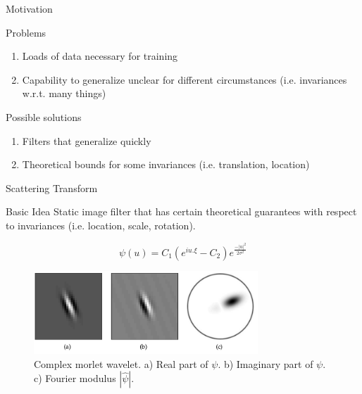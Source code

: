 \documentclass[compress]{beamer}
\begin{document}
	\begin{frame}{Motivation}
		\begin{block}{Problems}
			\begin{enumerate}
				\item Loads of data necessary for training
				\item Capability to generalize unclear for different circumstances (i.e. invariances w.r.t. many things)
			\end{enumerate}
		\end{block}
		\begin{block}{Possible solutions}
			\begin{enumerate}
				\item Filters that generalize quickly
				\item Theoretical bounds for some invariances (i.e. translation, location)
			\end{enumerate}
		\end{block}
	\end{frame}
	\begin{frame}{Scattering Transform}
		\begin{block}{Basic Idea}
			Static image filter that has certain theoretical guarantees with respect to invariances (i.e. location, scale, rotation).
		\end{block}
		\begin{equation}
		\psi(u) = C_1 (e^{iu.\xi} - C_2) e^{\frac{-|u|^2}{2\sigma^2}}
		\label{eq:morlet2d}
		\end{equation}
		\begin{figure}[!htb]
			\centering
			\includegraphics[width = 0.75\textwidth]{images/morlet2d.png}
			\caption{Complex morlet wavelet. a) Real part of $\psi$. b) Imaginary part of $\psi$. c) Fourier modulus $|\hat{\psi}|$.}
			\label{fig:morlet2d}
		\end{figure}
	\end{frame}
\end{document}
